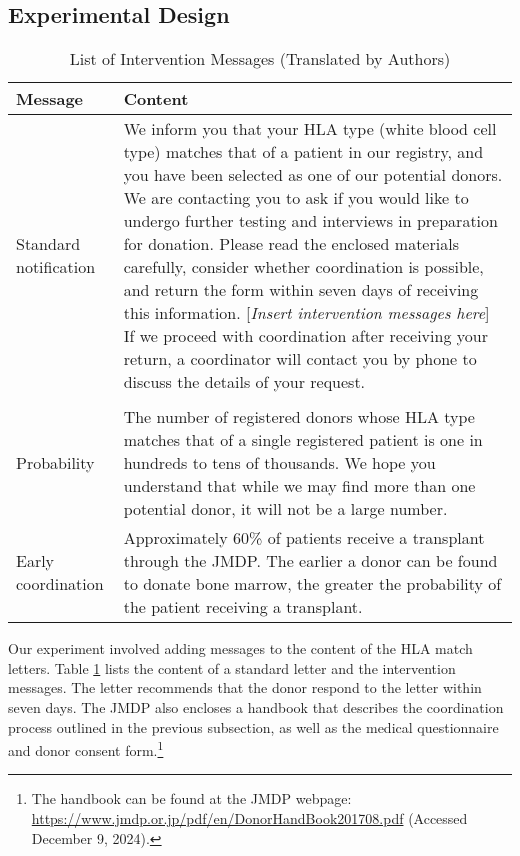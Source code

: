 \documentclass[12pt, a4paper]{article}
\begin{document}
\hypertarget{design}{%
\subsection{Experimental Design}\label{design}}

\begin{table}

\caption{\label{tab:list-message}List of Intervention Messages (Translated by Authors)}
\centering
\fontsize{8}{10}\selectfont
\begin{tabular}[t]{l>{\raggedright\arraybackslash}p{40em}}
\toprule
Message & Content\\
\midrule
Standard notification & We inform you that your HLA type (white blood cell type) matches that of a patient in our registry, and you have been selected as one of our potential donors. We are contacting you to ask if you would like to undergo further testing and interviews in preparation for donation. Please read the enclosed materials carefully, consider whether coordination is possible, and return the form within seven days of receiving this information. [\emph{Insert intervention messages here}] If we proceed with coordination after receiving your return, a coordinator will contact you by phone to discuss the details of your request.\\
\addlinespace[0.3em]
\multicolumn{2}{l}{\textbf{Intervention message}}\\
\hspace{1em}Probability & The number of registered donors whose HLA type matches that of a single registered patient is one in hundreds to tens of thousands. We hope you understand that while we may find more than one potential donor, it will not be a large number.\\
\hspace{1em}Early coordination & Approximately 60\% of patients receive a transplant through the JMDP. The earlier a donor can be found to donate bone marrow, the greater the probability of the patient receiving a transplant.\\
\bottomrule
\end{tabular}
\end{table}

Our experiment involved adding messages to the content of the HLA match letters. Table \ref{tab:list-message} lists the content of a standard letter and the intervention messages. The letter recommends that the donor respond to the letter within seven days. The JMDP also encloses a handbook that describes the coordination process outlined in the previous subsection, as well as the medical questionnaire and donor consent form.\footnote{The handbook can be found at the JMDP webpage: \url{https://www.jmdp.or.jp/pdf/en/DonorHandBook201708.pdf} (Accessed December 9, 2024).}
\end{document}
